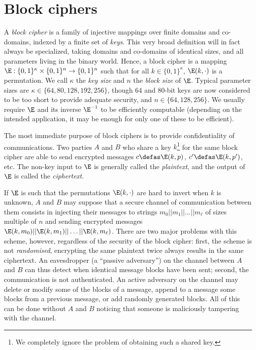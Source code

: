 \section{Block ciphers}

A \emph{block cipher} is a family of injective mappings over finite domains and co-domains, indexed by a finite set of \emph{keys}. This very broad definition will
in fact always be specialized, taking domains and co-domains of identical sizes, and all parameters living in the binary world. Hence, a block cipher
is a mapping $\E : \{0,1\}^\kappa \times \{0,1\}^n \rightarrow \{0,1\}^n$ such that for all $k \in \{0,1\}^\kappa$, $\E(k,\cdot)$ is a permutation.
We call $\kappa$ the \emph{key size} and $n$ the \emph{block size} of $\E$. Typical parameter sizes are $\kappa \in \{64, 80, 128, 192, 256\}$, though
64 and 80-bit keys are now considered to be too short to provide adequate security, and $n \in \{64, 128, 256\}$.
We usually require $\E$ and its inverse $\E^{-1}$ to be efficiently computable (depending on the intended application, it may be enough for only
one of these to be efficient).

The most immediate purpose of block ciphers is to provide confidentiality of communications. Two parties $A$ and $B$ who share a key $k$\footnote{We
completely ignore the problem of obtaining such a shared key.} for the same
block cipher are able to send encrypted messages $c \defas \E(k,p)$, $c' \defas \E(k,p')$, etc. The non-key input to $\E$ is generally called
the \emph{plaintext}, and the output of $\E$ is called the \emph{ciphertext}.

If $\E$ is such that the permutations $\E(k,\cdot)$ are hard to invert when $k$ is unknown, $A$ and $B$ may suppose that a secure channel of communication
between them consists in injecting their messages to strings $m_0||m_1||\ldots||m_\ell$ of sizes multiple of $n$ and sending encrypted messages
$\E(k,m_0)||\E(k,m_1)||\ldots||\E(k,m_\ell)$. There are two major problems with this scheme, however, regardless of the security of the block
cipher: first, the scheme is not \emph{randomised}, \ie encrypting the same plaintext twice always results in the same ciphertext. An eavesdropper
(a ``passive adversary'') on the channel between $A$ and $B$ can thus detect when identical message blocks have been sent; second, the
communication is not authenticated. An active adversary on the channel may delete or modify some of the blocks of a message, append to a message
some blocks from a previous message, or add randomly generated blocks. All of this can be done without $A$ and $B$ noticing that someone
is maliciously tampering with the channel.


